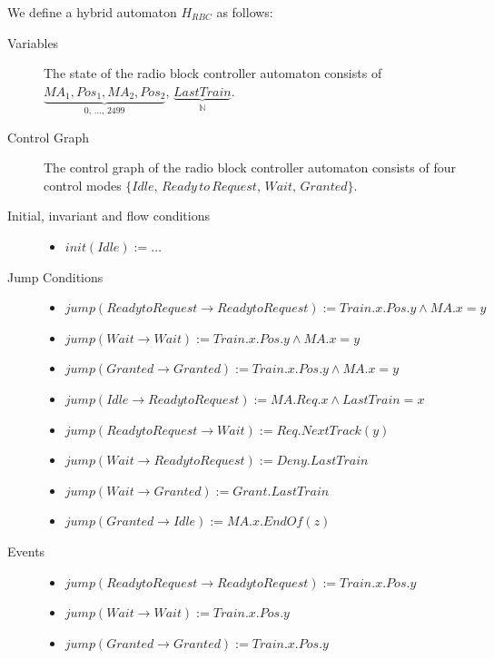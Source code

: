 \begin{mydef}

We define a hybrid automaton $H_{RBC}$ as follows:
\begin{description}
\item[Variables] The state of the radio block controller automaton consists of $\underbrace{MA_1, Pos_1, MA_2, Pos_2}_\text{0, \ldots , 2499}$, \newline $\underbrace{LastTrain}_{\mathbb{N}}$.

\item[Control Graph] The control graph of the radio block controller automaton consists of four control modes $\{Idle, \, Ready \, to \, Request, \, Wait, \, Granted \}$.

\item[Initial, invariant and flow conditions] \hspace*{0mm}
	\begin{itemize}
	\item $init(Idle) :=   \ldots $

	\end{itemize}

\item[Jump Conditions] \hspace*{0mm}

	\begin{itemize}
	\item $jump(Ready to Request \to Ready to Request) := Train.x.Pos.y \wedge MA.x = y$
	\item $jump(Wait \to Wait) := Train.x.Pos.y \wedge MA.x = y$
	\item $jump(Granted \to Granted) := Train.x.Pos.y \wedge MA.x = y$

	\item $jump(Idle \to Ready to Request) := MA.Req.x \wedge LastTrain = x$
	\item $jump(Ready to Request \to Wait) := Req.NextTrack(y)$
	\item $jump(Wait \to Ready to Request) := Deny.LastTrain$
	\item $jump(Wait \to Granted) := Grant.LastTrain$
	\item $jump(Granted \to Idle) := MA.x.EndOf(z)$



	\end{itemize}

\item[Events] \hspace*{0mm}
\begin{itemize}
\item $jump(Ready to Request \to Ready to Request) := Train.x.Pos.y$
	\item $jump(Wait \to Wait) := Train.x.Pos.y$
	\item $jump(Granted \to Granted) := Train.x.Pos.y $


\end{itemize}
\end{description}
\end{mydef}
